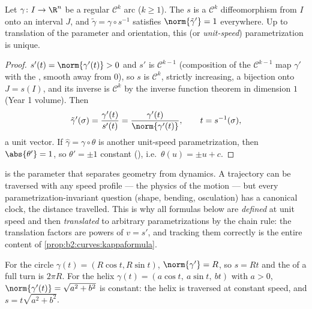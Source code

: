 \begin{theorem}\label{thm:b2:curves:arclength}
Let $\gamma \colon I \to \R^n$ be a regular $\mathcal{C}^k$ arc
($k \geq 1$). The  $s$ is a $\mathcal{C}^k$
diffeomorphism from $I$ onto an interval $J$, and $\tilde\gamma =
\gamma \circ s^{-1}$ satisfies $\norm{\tilde\gamma'} = 1$
everywhere. Up to translation of the parameter and orientation,
this \emph{} (or \emph{unit-speed}) parametrization is
unique.
\end{theorem}

\begin{proof}
$s'(t) = \norm{\gamma'(t)} > 0$ and $s'$ is $\mathcal{C}^{k-1}$
(composition of the $\mathcal{C}^{k-1}$ map $\gamma'$ with the ,
smooth away from $0$), so $s$ is $\mathcal{C}^k$, strictly
increasing, a bijection onto $J = s(I)$, and its inverse is
$\mathcal{C}^k$ by the inverse function theorem in dimension $1$
(Year 1 volume). Then
\[
\tilde\gamma'(\sigma)
= \frac{\gamma'(t)}{s'(t)}
= \frac{\gamma'(t)}{\norm{\gamma'(t)}},
\qquad t = s^{-1}(\sigma),
\]
a unit vector. If $\hat\gamma = \gamma\circ\theta$ is another
unit-speed parametrization, then $\abs{\theta'} = 1$, so $\theta'
= \pm 1$ constant (), i.e.\ $\theta(u) = \pm u + c$.
\end{proof}

\begin{remark}
 is the parameter that separates geometry from
dynamics. A trajectory can be traversed with any speed
profile --- the physics of the motion --- but every
parametrization-invariant question (shape, bending,
osculation) has a canonical clock, the distance travelled.
This is why all  formulas below are \emph{defined}
at unit speed and then \emph{translated} to arbitrary
parametrizations by the chain rule: the translation factors
are powers of $v = s'$, and tracking them correctly is the
entire content of \cref{prop:b2:curves:kappaformula}.
\end{remark}

\begin{example}\label{ex:b2:curves:helix}
For the circle $\gamma(t) = (R\cos t, R\sin t)$, $\norm{\gamma'} =
R$, so $s = Rt$ and the  of a full turn is $2\pi R$. For the
helix $\gamma(t) = (a\cos t,\ a\sin t,\ bt)$ with $a > 0$,
$\norm{\gamma'(t)} = \sqrt{a^2 + b^2}$ is constant: the helix is
traversed at constant speed, and $s = t\sqrt{a^2 + b^2}$.
\end{example}

